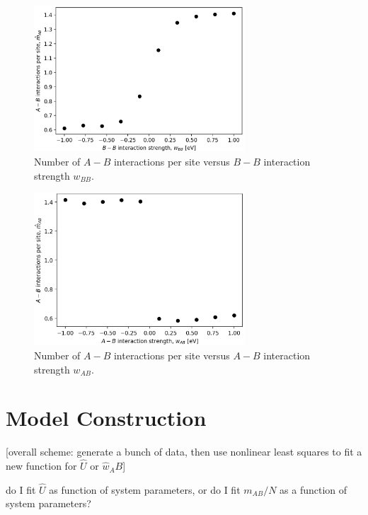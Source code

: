 \documentclass[10pt]{article}
\begin{document}
\begin{figure}[h!]
\centering
\includegraphics[width=0.70\textwidth]{Figures/m_AB_hat_versus_w_BB.png}
\caption{Number of $A-B$ interactions per site versus $B-B$ interaction strength $w_{BB}$.}
\label{fig:m_AB_hat_versus_w_BB}
\end{figure}

\begin{figure}[h!]
\centering
\includegraphics[width=0.70\textwidth]{Figures/m_AB_hat_versus_w_AB.png}
\caption{Number of $A-B$ interactions per site versus $A-B$ interaction strength $w_{AB}$.}
\label{fig:m_AB_hat_versus_w_AB}
\end{figure}



\section{Model Construction}
[overall scheme: generate a bunch of data, then use nonlinear least squares to fit a new function for $\hat{U}$ or $\hat{w}_AB$]

do I fit $\hat{U}$ as function of system parameters, or do I fit $m_{AB}/N$ as a function of system parameters?
\end{document}
